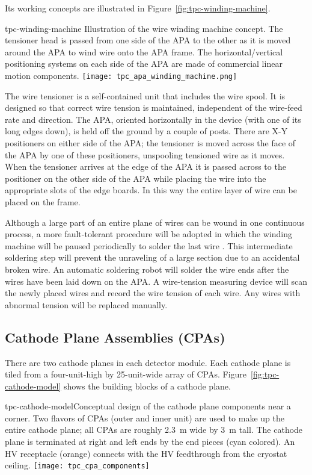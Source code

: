 Its working concepts are illustrated in
Figure~\ref{fig:tpc-winding-machine}.
\begin{cdrfigure}{tpc-winding-machine}
{Illustration of the wire winding machine concept.  The tensioner 
head is passed from one side of the APA to the other as it is moved 
around the APA to wind wire onto the APA frame.  The horizontal/vertical 
positioning systems on each side of the APA are made of commercial linear motion components. }
\texttt{[image: tpc\_apa\_winding\_machine.png]}
\end{cdrfigure}
The wire tensioner is a self-contained unit that includes the wire
spool.  It is designed so that correct wire tension is maintained,
independent of the wire-feed rate and direction.  The APA,
oriented horizontally in the device (with one of its long edges down), is held off
the ground by a couple of posts.   There
are X-Y positioners on either side of the APA; the tensioner is moved
across the face of the APA by one of these positioners, unspooling
tensioned wire as it moves.  When the tensioner arrives at the edge of
the APA it is passed across to the positioner on the other side of the APA
while placing the wire into the appropriate slots of the edge
boards.  In this way the entire layer of wire can be placed on the
frame. 

Although a large part of an entire plane of wires can be wound in one
continuous process, a more fault-tolerant procedure will be adopted in which %
the winding machine will be paused periodically to solder the last wire . This
intermediate soldering step will prevent the unraveling of a large
section due to an accidental broken wire.  An automatic soldering
robot will solder the wire ends after the wires have been laid down on
the APA. A wire-tension measuring device will scan the newly placed
wires and record the wire tension of each wire. Any wires with
abnormal tension will be replaced manually.


\subsection{Cathode Plane Assemblies (CPAs)}
\label{subsec:fd-ref-cpa}

There are two cathode planes in each detector module.  Each cathode plane is 
tiled from a four-unit-high by 25-unit-wide array of CPAs. Figure~\ref{fig:tpc-cathode-model} shows the
building blocks of a cathode plane.  
\begin{cdrfigure} 
{tpc-cathode-model}{Conceptual design of the cathode plane 
components near a corner.  Two flavors of CPAs (outer 
and inner unit) are used to make up the entire cathode plane; all
CPAs are roughly 2.3~m wide by 3~m tall. 
The cathode plane is terminated at %
right and left ends by the end pieces (cyan colored).  An HV receptacle 
(orange) connects with the HV feedthrough from the cryostat ceiling. }
\texttt{[image: tpc\_cpa\_components]}
\end{cdrfigure}

